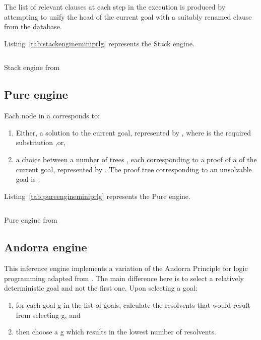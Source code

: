 \documentclass[thesis-solanki.tex]{files}
\begin{document}
The list of relevant clauses at each step in the execution is produced by attempting to unify the head of the current goal with a suitably
renamed clause from the database.

Listing~\ref{tab:stackengineminiprlg} represents the Stack engine.

\begin{code-list}[H]
\begin{singlespace}
\inputminted[linenos, firstline=29, lastline=56]{haskell}{haskell-proto3-sudsy-woe.hs}
\end{singlespace}
\caption{Stack engine from \cite{website:mini-prolog-hugs98}}
\label{tab:stackengineminiprlg}
\end{code-list}

\subsection{Pure engine}
 Each node in a  corresponds to:
\begin{enumerate}
\item Either, a solution to the current goal, represented by , where  is the required 
 substitution ,or,
 
\item a choice between a number of trees , each corresponding to a proof of a  of the current 
goal, represented by . 
The proof tree corresponding to an unsolvable goal is . 
\end{enumerate}

Listing~\ref{tab:pureengineminiprlg} represents the Pure engine.

\begin{code-list}[H]
\begin{singlespace}
\inputminted[linenos, firstline=26, lastline=46]{haskell}{haskell-proto3-absurd-silicon.hs}
\end{singlespace}
\caption{Pure engine from \cite{website:mini-prolog-hugs98}}
\label{tab:pureengineminiprlg}
\end{code-list}

\subsection{Andorra engine}
This inference engine implements a variation of the Andorra Principle for logic programming adapted from \cite{haridi1990kernel}. 
The main difference here is to select a relatively deterministic goal and not the first one. Upon selecting a goal:
\begin{enumerate}
\item for each goal g in the list of goals, calculate the resolvents that would result from selecting g, and

\item then choose a g which results in the lowest number of resolvents.
\end{enumerate}
\end{document}
